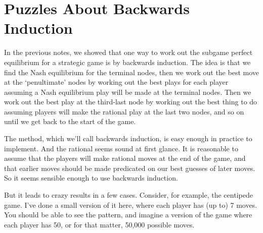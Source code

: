 \section{Puzzles About Backwards Induction}
In the previous notes, we showed that one way to work out the subgame perfect equilibrium for a strategic game is by backwards induction. The idea is that we find the Nash equilibrium for the terminal nodes, then we work out the best move at the `penultimate' nodes by working out the best plays for each player assuming a Nash equilibrium play will be made at the terminal nodes. Then we work out the best play at the third-last node by working out the best thing to do assuming players will make the rational play at the last two nodes, and so on until we get back to the start of the game.

The method, which we'll call backwards induction, is easy enough in practice to implement. And the rational seems sound at first glance. It is reasonable to assume that the players will make rational moves at the end of the game, and that earlier moves should be made predicated on our best guesses of later moves. So it seems sensible enough to use backwards induction.

But it leads to crazy results in a few cases. Consider, for example, the centipede game. I've done a small version of it here, where each player has (up to) 7 moves. You should be able to see the pattern, and imagine a version of the game where each player has 50, or for that matter, 50,000 possible moves.


